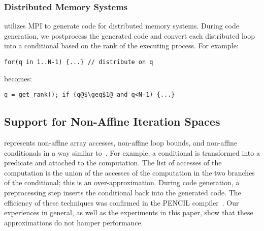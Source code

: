 \subsubsection{Distributed Memory Systems}

\framework{} utilizes MPI to generate code for distributed memory systems.  During code generation, we postprocess the generated code and convert each distributed loop into a conditional based on the rank of the executing process. For example:
\vspace{-0.15cm}
\begin{lstlisting}[numbers=none]
for(q in 1..N-1) {...} // distribute on q
\end{lstlisting}
\vspace{-0.15cm}
becomes:
\vspace{-0.15cm}
\begin{lstlisting}[escapechar=@,numbers=none]
q = get_rank(); if (q@$\geq$1@ and q<N-1) {...}
\end{lstlisting}



\vspace{-0.25cm}
\subsection{Support for Non-Affine Iteration Spaces\label{nonaffine}}

\framework represents non-affine array accesses, non-affine loop bounds, and non-affine conditionals in a way similar to~\citet{Benabderrahmane}.
For example, a conditional is transformed into a predicate and attached to the computation.  The list of accesses of the computation is the union of the accesses of the computation in the two branches of the conditional; this is an over-approximation. During code generation, a preprocessing step inserts the conditional back into the generated code.  The efficiency of these techniques was confirmed in the PENCIL compiler~\cite{pencil}. Our experiences in general, as well as the experiments in this paper, show that these approximations do not hamper performance.

